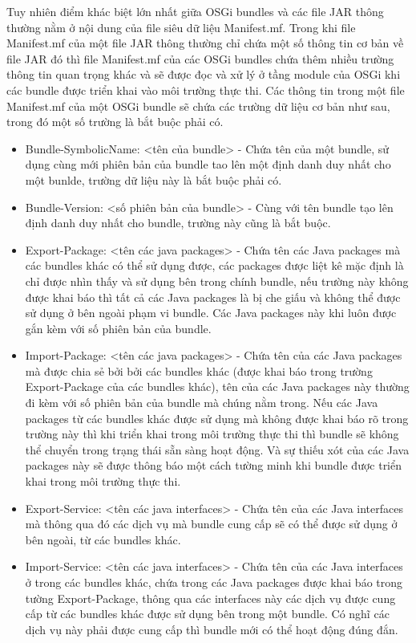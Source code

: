 Tuy nhiên điểm khác biệt lớn nhất giữa OSGi bundles và các file JAR thông thường nằm ở nội dung của file siêu dữ liệu Manifest.mf. Trong khi file Manifest.mf của một file JAR thông thường chỉ chứa một số thông tin cơ bản về file JAR đó thì file Manifest.mf của các OSGi bundles chứa thêm nhiều trường thông tin quan trọng khác và sẽ được đọc và xử lý ở tầng module của OSGi khi các bundle được triển khai vào môi trường thực thi. Các thông tin trong một file Manifest.mf của một OSGi bundle sẽ chứa các trường dữ liệu cơ bản như sau, trong đó một số trường là bắt buộc phải có.
\begin{itemize}
\item Bundle-SymbolicName: <tên của bundle> - Chứa tên của một bundle, sử dụng cùng mới phiên bản của bundle tao lên một định danh duy nhất cho một bunlde, trường dữ liệu này là bắt buộc phải có.
\item Bundle-Version: <số phiên bản của bundle> - Cùng với tên bundle tạo lên định danh duy nhất cho bundle, trường này cũng là bắt buộc.
\item Export-Package: <tên các java packages> - Chứa tên các Java packages mà các bundles khác có thể sử dụng được, các packages được liệt kê mặc định là chỉ được nhìn thấy và sử dụng bên trong chính bundle, nếu trường này không được khai báo thì tất cả các Java packages là bị che giấu và không thể được sử dụng ở bên ngoài phạm vi bundle. Các Java packages này khi luôn được gắn kèm với số phiên bản của bundle.
\item Import-Package: <tên các java packages> - Chứa tên của các Java packages mà được chia sẻ bởi bởi các bundles khác (được khai báo trong trường Export-Package của các bundles khác), tên của các Java packages này thường đi kèm với số phiên bản của bundle mà chúng nằm trong. Nếu các Java packages từ các bundles khác được sử dụng mà không được khai báo rõ trong trường này thì khi triển khai trong môi trường thực thi thì bundle sẽ không thể chuyển trong trạng thái sẵn sàng hoạt động. Và sự thiếu xót của các Java packages này sẽ được thông báo một cách tường minh khi bundle được triển khai trong môi trường thực thi.
\item Export-Service: <tên các java interfaces> - Chứa tên của các Java interfaces mà thông qua đó các dịch vụ mà bundle cung cấp sẽ có thể được sử dụng ở bên ngoài, từ các bundles khác.
\item Import-Service: <tên các java interfaces> - Chứa tên của các Java interfaces ở trong các bundles khác, chứa trong các Java packages được khai báo trong tường Export-Package, thông qua các interfaces này các dịch vụ được cung cấp từ các bundles khác được sử dụng bên trong một bundle. Có nghĩ các dịch vụ này phải được cung cấp thì bundle mới có thể hoạt động đúng đắn.
\end{itemize}  
